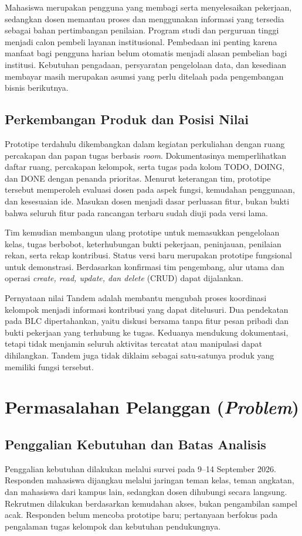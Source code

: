 \documentclass[12pt,a4paper,oneside]{report}
\begin{document}
Mahasiswa merupakan pengguna yang membagi serta menyelesaikan pekerjaan, sedangkan dosen memantau proses dan menggunakan informasi yang tersedia sebagai bahan pertimbangan penilaian. Program studi dan perguruan tinggi menjadi calon pembeli layanan institusional. Pembedaan ini penting karena manfaat bagi pengguna harian belum otomatis menjadi alasan pembelian bagi institusi. Kebutuhan pengadaan, persyaratan pengelolaan data, dan kesediaan membayar masih merupakan asumsi yang perlu ditelaah pada pengembangan bisnis berikutnya.

\subsection{Perkembangan Produk dan Posisi Nilai}
Prototipe terdahulu dikembangkan dalam kegiatan perkuliahan dengan ruang percakapan dan papan tugas berbasis \textit{room}. Dokumentasinya memperlihatkan daftar ruang, percakapan kelompok, serta tugas pada kolom TODO, DOING, dan DONE dengan penanda prioritas. Menurut keterangan tim, prototipe tersebut memperoleh evaluasi dosen pada aspek fungsi, kemudahan penggunaan, dan kesesuaian ide. Masukan dosen menjadi dasar perluasan fitur, bukan bukti bahwa seluruh fitur pada rancangan terbaru sudah diuji pada versi lama.

Tim kemudian membangun ulang prototipe untuk memasukkan pengelolaan kelas, tugas berbobot, keterhubungan bukti pekerjaan, peninjauan, penilaian rekan, serta rekap kontribusi. Status versi baru merupakan prototipe fungsional untuk demonstrasi. Berdasarkan konfirmasi tim pengembang, alur utama dan operasi \textit{create, read, update, dan delete} (CRUD) dapat dijalankan.

Pernyataan nilai Tandem adalah membantu mengubah proses koordinasi kelompok menjadi informasi kontribusi yang dapat ditelusuri. Dua pendekatan pada BLC dipertahankan, yaitu diskusi bersama tanpa fitur pesan pribadi dan bukti pekerjaan yang terhubung ke tugas. Keduanya mendukung dokumentasi, tetapi tidak menjamin seluruh aktivitas tercatat atau manipulasi dapat dihilangkan. Tandem juga tidak diklaim sebagai satu-satunya produk yang memiliki fungsi tersebut.

\section{Permasalahan Pelanggan (\textit{Problem})}
\subsection{Penggalian Kebutuhan dan Batas Analisis}
Penggalian kebutuhan dilakukan melalui survei pada 9--14 September 2026. Responden mahasiswa dijangkau melalui jaringan teman kelas, teman angkatan, dan mahasiswa dari kampus lain, sedangkan dosen dihubungi secara langsung. Rekrutmen dilakukan berdasarkan kemudahan akses, bukan pengambilan sampel acak. Responden belum mencoba prototipe baru; pertanyaan berfokus pada pengalaman tugas kelompok dan kebutuhan pendukungnya.
\end{document}
